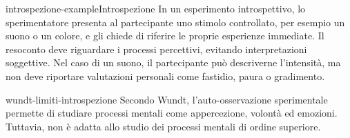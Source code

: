 \documentclass[preview]{standalone}
\begin{document}
\begin{snippetexample}{introspezione-example}{Introspezione}
    In un esperimento introspettivo, lo sperimentatore presenta al partecipante
    uno stimolo controllato, per esempio un suono o un colore, e gli chiede di
    riferire le proprie esperienze immediate. Il resoconto deve riguardare i
    processi percettivi, evitando interpretazioni soggettive. Nel caso di un
    suono, il partecipante può descriverne l'intensità, ma non deve riportare
    valutazioni personali come fastidio, paura o gradimento.
\end{snippetexample}

\begin{snippet}{wundt-limiti-introspezione}
    Secondo Wundt, l'auto-osservazione sperimentale permette di studiare
    processi mentali come appercezione, volontà ed emozioni. Tuttavia, non è
    adatta allo studio dei processi mentali di ordine superiore.
\end{snippet}
\end{document}
